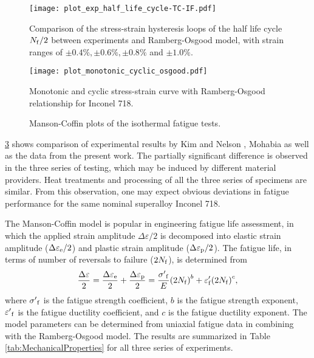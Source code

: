\begin{figure}[!htp]
  \centering
  \texttt{[image: plot\_exp\_half\_life\_cycle-TC-IF.pdf]}
  \caption{Comparison of the stress-strain hysteresis loops of the half life cycle $N_{\rm f}/2$ between experiments and Ramberg-Osgood model, with strain ranges of $\pm0.4\%, \pm0.6\%, \pm0.8\%$ and $\pm1.0\%$.}
  \label{Fig:plot_exp_half_life_cycle}
\end{figure}

\begin{figure}[!htp]
  \centering
  \texttt{[image: plot\_monotonic\_cyclic\_osgood.pdf]}
  \caption{Monotonic and cyclic stress-strain curve with Ramberg-Osgood relationship for Inconel 718.}
  \label{Fig:plot_monotonic_cyclic_osgood}
\end{figure}

\begin{figure}[!htp]
  \caption{Manson-Coffin plots of the isothermal fatigue tests.}
  \label{Fig:Baseline}
\end{figure}

\ref{Fig:Baseline} shows comparison of experimental results by Kim \cite{kim1988elevated} and Nelson \cite{nelson1992creep}, Mohabia \cite{Mahobia2014} as well as the data from the present work. The partially significant difference is observed in the three series of testing, which may be induced by different material providers. Heat treatments and processing of all the three series of specimens are similar. From this observation, one may expect obvious deviations in fatigue performance for the same nominal superalloy Inconel 718.

The Manson-Coffin model is popular in engineering fatigue life assessment, in which the applied strain amplitude $\Delta \varepsilon/2$ is decomposed into elastic strain amplitude ($\Delta \varepsilon_{\rm e}/2$) and plastic strain amplitude ($\Delta \varepsilon_{\rm p}/2$). The fatigue life, in terms of number of reversals to failure ($2N_{\rm f}$), is determined from
\begin{equation}
\frac{{\Delta \varepsilon }}{2} = \frac{{\Delta {\varepsilon _{\rm e}}}}{2} + \frac{{\Delta {\varepsilon _{\rm p}}}}{2} = \frac{{{{\sigma '}_{\rm f}}}}{E}{\left( {2{N_{\rm f}}} \right)^b} + {\varepsilon '_{\rm f}}{\left( {2{N_{\rm f}}} \right)^c},
\label{Equ:CoffinManson}
\end{equation}
where ${{{\sigma '}_{\rm f}}}$ is the fatigue strength coefficient, $b$ is the fatigue strength exponent, ${{{\varepsilon '}_{\rm f}}}$ is the fatigue ductility coefficient, and $c$ is the fatigue ductility exponent. The model parameters can be determined from uniaxial fatigue data in combining with the Ramberg-Osgood model. The results are summarized in Table \ref{tab:MechanicalProperties} for all three series of experiments.

